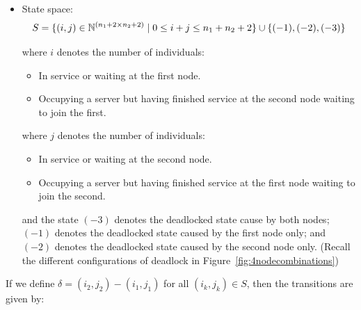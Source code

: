 \documentclass{article}
\begin{document}
\begin{itemize}
    \item State space:
        \[S = \{(i,j)\in\mathbb{N}^{(n_1+2\times n_2+2)} \nonscript\; | \nonscript\; 0 \leq i + j \leq n_1 + n_2 + 2
        \}\cup\{(-1), (-2), (-3)\}\]

        where \(i\) denotes the number of individuals:
            \begin{itemize}
                \item In service or waiting at the first node.
                \item Occupying a server but having finished service at the
                    second node waiting to join the first.
            \end{itemize}
        where \(j\) denotes the number of individuals:
            \begin{itemize}
                \item In service or waiting at the second node.
                \item Occupying a server but having finished service at the
                    first node waiting to join the second.
            \end{itemize}
        and the state $(-3)$ denotes the deadlocked state cause by both nodes; $(-1)$ denotes the deadlocked state caused by the first node only; and $(-2)$ denotes the deadlocked state caused by the second node only. (Recall the different configurations of deadlock in Figure~\ref{fig:4nodecombinations})
\end{itemize}

If we define $\delta = (i_2, j_2) - (i_1, j_1)$ for all $(i_k, j_k) \in S$, then the transitions are given by:
\end{document}
